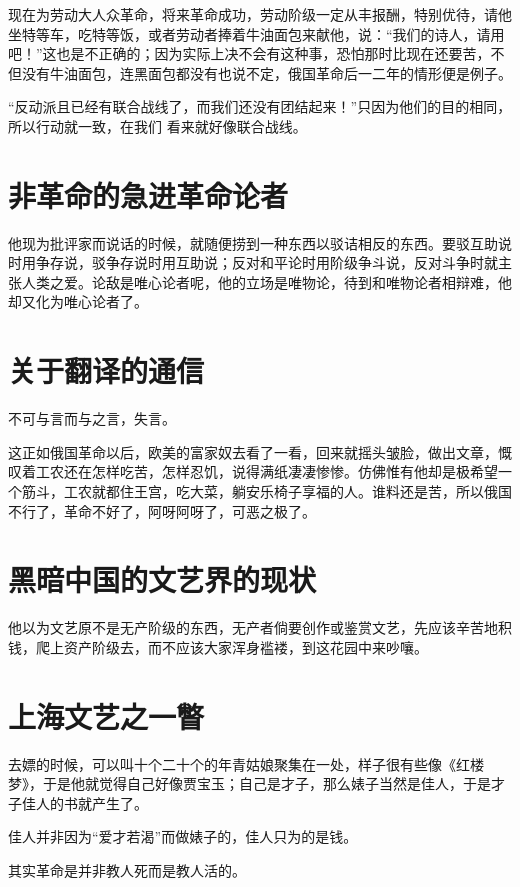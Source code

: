 \documentclass[a4paper]{article}
\begin{document}
\begin{sloppy}
        现在为劳动大人众革命，将来革命成功，劳动阶级一定从丰报酬，特别优待，请他坐特等车，吃特等饭，或者劳动者捧着牛油面包来献他，说：“我们的诗人，请用吧！”这也是不正确的；因为实际上决不会有这种事，恐怕那时比现在还要苦，不但没有牛油面包，连黑面包都没有也说不定，俄国革命后一二年的情形便是例子。

        “反动派且已经有联合战线了，而我们还没有团结起来！”只因为他们的目的相同，所以行动就一致，在我们 看来就好像联合战线。

        \section{
            非革命的急进革命论者
        }
        他现为批评家而说话的时候，就随便捞到一种东西以驳诘相反的东西。要驳互助说时用争存说，驳争存说时用互助说；反对和平论时用阶级争斗说，反对斗争时就主张人类之爱。论敌是唯心论者呢，他的立场是唯物论，待到和唯物论者相辩难，他却又化为唯心论者了。

        \section{
            关于翻译的通信
        }
        不可与言而与之言，失言。

        这正如俄国革命以后，欧美的富家奴去看了一看，回来就摇头皱脸，做出文章，慨叹着工农还在怎样吃苦，怎样忍饥，说得满纸凄凄惨惨。仿佛惟有他却是极希望一个筋斗，工农就都住王宫，吃大菜，躺安乐椅子享福的人。谁料还是苦，所以俄国不行了，革命不好了，阿呀阿呀了，可恶之极了。

        \section{
            黑暗中国的文艺界的现状
        }
        他以为文艺原不是无产阶级的东西，无产者倘要创作或鉴赏文艺，先应该辛苦地积钱，爬上资产阶级去，而不应该大家浑身褴褛，到这花园中来吵嚷。

        \section{
            上海文艺之一瞥
        }
        去嫖的时候，可以叫十个二十个的年青姑娘聚集在一处，样子很有些像《红楼梦》，于是他就觉得自己好像贾宝玉；自己是才子，那么婊子当然是佳人，于是才子佳人的书就产生了。

        佳人并非因为“爱才若渴”而做婊子的，佳人只为的是钱。

        其实革命是并非教人死而是教人活的。


\end{sloppy}
\end{document}
